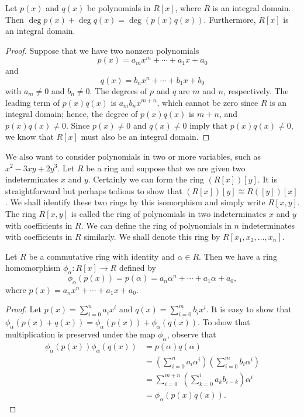 \begin{proposition}\label{poly:integral_domain_ther}
Let $p(x)$ and $q(x)$ be polynomials in $R[x]$, where $R$ is an integral domain.  Then $\deg p(x) + \deg q(x) = \deg( p(x) q(x) )$.  Furthermore, $R[x]$ is an integral domain.
\end{proposition}

\begin{proof}
Suppose that we have two nonzero polynomials 
\[
p(x) = a_m x^m + \cdots + a_1 x + a_0
\]
and 
\[
q(x) = b_n x^n + \cdots + b_1 x + b_0
\]
with $a_m \neq 0$ and $b_n \neq 0$. The degrees of $p$ and $q$ are $m$ and $n$, respectively.  The leading term of $p(x) q(x)$ is $a_m b_n x^{m + n}$, which cannot be zero since $R$ is an integral domain; hence, the degree of $p(x) q(x)$ is $m + n$, and $p(x)q(x) \neq 0$.  Since $p(x) \neq 0$ and $q(x) \neq 0$ imply that $p(x)q(x) \neq 0$, we know that $R[x]$ must also be an integral domain.
\end{proof}

\medskip

We also want to consider polynomials in two or more variables, such as $x^2 - 3 x y + 2 y^3$.  Let $R$ be a ring and suppose that we are given two indeterminates $x$ and $y$.  Certainly we can form the ring $(R[x])[y]$.  It is straightforward but perhaps tedious to show that $(R[x])[y] \cong R([y])[x]$.  We shall identify these two rings by this isomorphism and simply write $R[x,y]$.  The ring $R[x, y]$ is called the {\bfi ring of polynomials in two indeterminates $x$ and $y$ with coefficients in} $R$.  We can define the {\bfi ring of polynomials in} $n$ {\bfi indeterminates with coefficients in} $R$ similarly.  We shall denote this ring by $R[x_1, x_2, \ldots, x_n]$\label{notepolynvar}.  

\begin{theorem}\label{poly_theorem_3}
Let $R$ be a commutative ring with identity and $\alpha \in R$.  Then we have a ring homomorphism  $\phi_{\alpha} : R[x] \rightarrow R$\label{noteevalhomo} defined by  
\[
\phi_{\alpha} (p(x) ) = p( \alpha ) = a_n \alpha^n + \cdots + a_1 \alpha + a_0,
\]
where $p( x ) = a_n x^n + \cdots + a_1 x + a_0$.
\end{theorem}

\begin{proof}
Let $p(x) = \sum_{i = 0}^n a_i x^i$ and $q(x) = \sum_{i = 0}^m b_i x^i$.  It is easy to show that $\phi_{\alpha}(p(x) + q(x)) = \phi_{\alpha}(p(x))  + \phi_{\alpha}(q(x))$.  To show that multiplication is preserved under the map $\phi_{\alpha}$, observe that
\begin{align*}
\phi_{\alpha} (p(x) ) \phi_{\alpha} (q(x) ) 
& = 
p( \alpha ) q(\alpha) \\
& = 
\left(
\sum_{i = 0}^n a_i \alpha^i
\right)
\left(
\sum_{i=0}^m b_i \alpha^i
\right) \\
& = 
\sum_{i=0}^{m+n} 
\left(
\sum_{k=0}^i a_k b_{i-k}
\right)  \alpha^i \\
& =
\phi_{\alpha} (p(x) q(x) ). 
\end{align*}
\end{proof}

